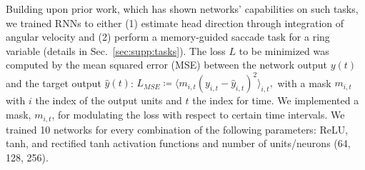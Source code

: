 \documentclass{article} %
\newcounter{ct}
\theoremstyle{definition}
\theoremstyle{remark}
\begin{document}
Building upon prior work, which has shown networks' capabilities on such tasks, we trained RNNs to either
(1) estimate head direction through integration of angular velocity \citep{cueva2019headdirection, cueva2021continuous}
and (2) perform a memory-guided saccade task for a ring variable \citep{wimmer2014} (details in Sec.~\ref{sec:supp:tasks}).
The loss \(L\) to be minimized was computed by the mean squared error (MSE) between the network output \(y(t)\) and the target output \(\hat y(t)\):
\(L_{MSE} \coloneqq \langle m_{i,t}(y_{i,t}-\hat y_{i,t})^2\rangle_{i,t}, \)
with a mask \(m_{i,t}\) with \(i\) the index of the output units and \(t\)  the index for time.
We implemented a mask, \(m_{i,t}\), for modulating the loss with respect to certain time intervals.
We trained 10 networks for every combination of the following parameters:
 ReLU, tanh, and rectified tanh activation functions and
 number of units/neurons (64, 128, 256).



\end{document}
